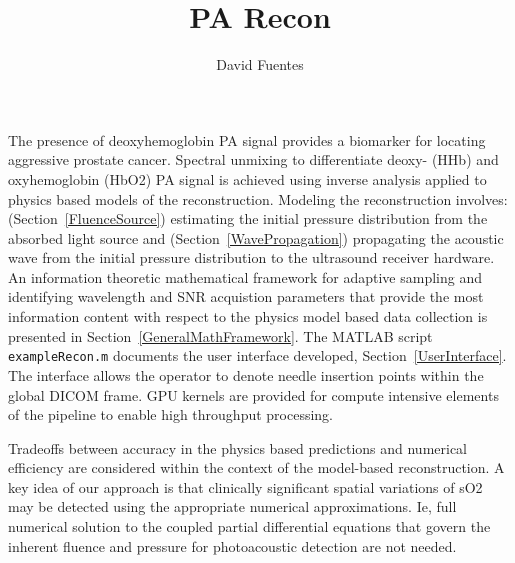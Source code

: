 \documentclass{article}         %
\title{PA Recon}
\author{David Fuentes}
\theoremstyle{definition}
\theoremstyle{remark}
\begin{document}
\maketitle





The presence of deoxyhemoglobin PA signal provides a biomarker for locating
aggressive prostate cancer.  Spectral unmixing to differentiate deoxy- (HHb)
and oxyhemoglobin (HbO2) PA signal is achieved using inverse analysis
applied to physics based models of the reconstruction. 
Modeling the reconstruction involves: (Section~\ref{FluenceSource})
estimating the initial pressure distribution from the absorbed light source
and (Section~\ref{WavePropagation}) propagating the acoustic wave from the
initial pressure distribution to the ultrasound receiver hardware.
An information theoretic mathematical framework for adaptive sampling and 
identifying wavelength and SNR
acquistion parameters that provide the most information content 
with respect to the physics model based data collection
is presented in Section~\ref{GeneralMathFramework}.
The MATLAB script \texttt{exampleRecon.m} documents the user interface
developed, Section~\ref{UserInterface}. 
The interface allows the operator to denote needle insertion
points within the global DICOM frame. GPU kernels are provided
for compute intensive elements of the pipeline to enable high
throughput processing.

%
%

Tradeoffs between accuracy in the physics based predictions and numerical
efficiency are considered within the context of the model-based
reconstruction. A key idea of our approach is that clinically significant
spatial variations of sO2 may be detected using the appropriate numerical
approximations. Ie, full numerical solution to the coupled partial
differential equations that govern the inherent fluence and pressure for
photoacoustic detection are not needed.
\end{document}
